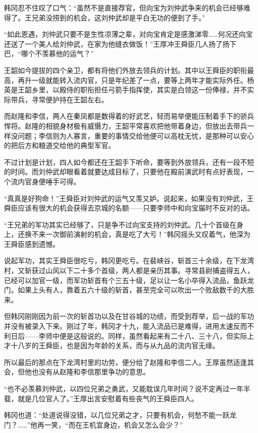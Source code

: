 韩冈忍不住叹了口气：“虽然不是直接荐官，但向宝为刘仲武争来的机会已经够难得了。王兄弟没捞到的机会，这刘仲武却是平白无功的便到了手。”

“如此恩遇，刘仲武只要不是生性凉薄之辈，对向宝肯定是感激涕零……何况还向宝还送了一个美人给刘仲武，在家为他缝衣做饭！”王厚冲王舜臣几人扬了扬下巴，“哪个不羡慕他的运气？”

王韶如今提拔的四个亲卫，都有将他们外放去领兵的计划。其中以王舜臣的职衔最高，再升一级就能转入流内官，只是年纪差了一点，要等上两年才能实际外任。杨英是王韶乡里，以殿侍的职衔担任弓箭手指挥使，其实是白领这一份俸禄，并不实际带兵，寻常便护持在王韶左右。

而赵隆和李信，两人在秦凤都是数得着的好武艺，轻而易举便能压制着手下的骄兵悍将。赵隆的相貌身材极有威慑力，王韶平常喜欢把他带着身边，但放出去带兵一样没问题；李信则为人寡言，重要的事情交给他便可以高枕无忧，是那种可以安心的把后方和粮道交给他的典型军官。

不过计划是计划，四人如今都还在王韶手下听命，要等到外放领兵，还有一段不短的时间。而刘仲武却眼看着就要达成目标了，只要他在殿前演武时有点好表现，一个流内官身便唾手可得。

“真真是好狗命！”王舜臣对刘仲武的运气又羡又妒。说起来，如果没有刘仲武，王舜臣应该有很大的机会获得去京城的名额——只要李师中和向宝届时不反对的话。

“王兄弟的军功其实已经够了，只是争不过向宝支持的刘仲武。几十个首级在身上，还换不来一次御前演射的机会，真是吃了大亏！”韩冈摇头又叹着气，他深为王舜臣感到遗憾。

说起军功，其实王舜臣很吃亏，韩冈更吃亏。在裴峡谷，斩首三十余级，在下龙湾村，又斩获过山风以下二十多个首级，两人都是亲历其事。寻常县尉捕盗得五人，已经可以加官一级，而军功斩首有个三五十级，足以让一名小卒得入流品，鱼跃龙门。如果上头有人，靠着五六十级的斩首，甚至完全可以吹出一个败敌数千的大胜来。

但韩冈刚刚因为前一次的斩首功以及在甘谷城的功绩，而受到荐举，后一战的军功并没有被录入下来。刚过了年，韩冈才十九，能入流品已是难得，进用太速反而不利日后——李师中便是这般说的。同样，虽然看起来有二十八、三十八，但实际上才十八岁的王舜臣，也是因为年龄的关系，而与从九品的流内官无缘。

所以最后的那点在下龙湾村里的功劳，便分给了赵隆和李信二人。王厚虽然适逢其会，但他也没有从赵隆和李信那里争功的意思。

“也不必羡慕刘仲武，以四位兄弟之勇武，又能耽误几年时间？说不定再过一年半载，就是几位官人了。”王厚出言安慰着有些丧气的王舜臣四人。

韩冈也道：“处道说得没错，以几位兄弟之才，只要有机会，何愁不能一跃龙门？……”他再一笑，“而在王机宜身边，机会又怎么会少？”

